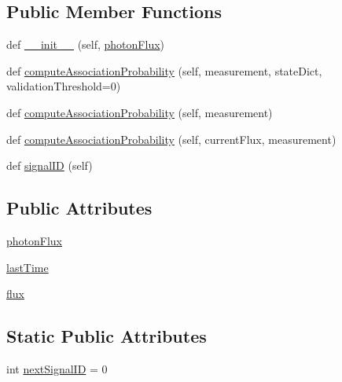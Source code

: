 \subsection*{Public Member Functions}
\begin{DoxyCompactItemize}
\item 
def \hyperlink{classSignals_1_1UniformNoiseXRaySource_a15d841ccc30dc405ec880bf73c306078}{\+\_\+\+\_\+init\+\_\+\+\_\+} (self, \hyperlink{classSignals_1_1UniformNoiseXRaySource_af240be1882d819db77da73100c4c95c5}{photon\+Flux})
\item 
def \hyperlink{classSignals_1_1UniformNoiseXRaySource_abe8f54c9edf95865afe7853c295d33bd}{compute\+Association\+Probability} (self, measurement, state\+Dict, validation\+Threshold=0)
\item 
def \hyperlink{classSignals_1_1StaticPoissonSource_a61351ebf4f75f28e227cfee7ca7e5d64}{compute\+Association\+Probability} (self, measurement)
\item 
def \hyperlink{classSignals_1_1PoissonSource_a8e7a6023e7ee53ed0b5b81c7d0aa361c}{compute\+Association\+Probability} (self, current\+Flux, measurement)
\item 
def \hyperlink{classSignals_1_1SignalSource_a85016cca8a7f1e188d314ced50577d05}{signal\+ID} (self)
\end{DoxyCompactItemize}
\subsection*{Public Attributes}
\begin{DoxyCompactItemize}
\item 
\hyperlink{classSignals_1_1UniformNoiseXRaySource_af240be1882d819db77da73100c4c95c5}{photon\+Flux}
\item 
\hyperlink{classSignals_1_1PoissonSource_a66b0f3fb48cc130b6b07d7427092a522}{last\+Time}
\item 
\hyperlink{classSignals_1_1PoissonSource_a26e7bf25b1d9195bfded2a3ad6790bce}{flux}
\end{DoxyCompactItemize}
\subsection*{Static Public Attributes}
\begin{DoxyCompactItemize}
\item 
int \hyperlink{classSignals_1_1SignalSource_abcff0d069f17cb5ebe3eff15b6283a64}{next\+Signal\+ID} = 0
\end{DoxyCompactItemize}


